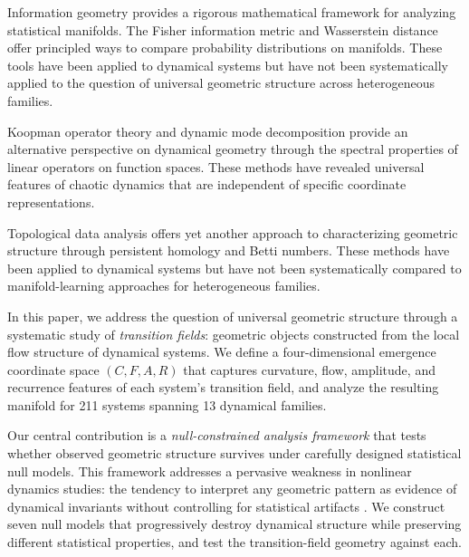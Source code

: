 \documentclass[aip,chaos,showpacs,superscriptaddress,groupedaddress]{revtex4-1}
\begin{document}
Information geometry \cite{amari2016information, amari1982differential, ay2017information} provides a rigorous mathematical framework for analyzing statistical manifolds. The Fisher information metric \cite{li2016fisher} and Wasserstein distance \cite{wasserstein1969sequential, villani2009optimal, peyre2019optimal} offer principled ways to compare probability distributions on manifolds. These tools have been applied to dynamical systems \cite{magnasco2009thermodynamic, bialek2001physics, bialek2014approach} but have not been systematically applied to the question of universal geometric structure across heterogeneous families.

Koopman operator theory \cite{koopman1931hamiltonian, mezic2013analysis} and dynamic mode decomposition \cite{brunton2021data, kutz2017dynamic} provide an alternative perspective on dynamical geometry through the spectral properties of linear operators on function spaces. These methods have revealed universal features of chaotic dynamics \cite{farmer1987predicting, kantz1997nonlinear, schreiber1999interdisciplinary} that are independent of specific coordinate representations.

Topological data analysis \cite{carlsson2009topology, edelsbrunner2010computational, zomorodian2005persistent} offers yet another approach to characterizing geometric structure through persistent homology and Betti numbers. These methods have been applied to dynamical systems \cite{sporns2011nonlinear} but have not been systematically compared to manifold-learning approaches for heterogeneous families.

In this paper, we address the question of universal geometric structure through a systematic study of \emph{transition fields}: geometric objects constructed from the local flow structure of dynamical systems. We define a four-dimensional emergence coordinate space $(C, F, A, R)$ that captures curvature, flow, amplitude, and recurrence features of each system's transition field, and analyze the resulting manifold for 211 systems spanning 13 dynamical families.

Our central contribution is a \emph{null-constrained analysis framework} that tests whether observed geometric structure survives under carefully designed statistical null models. This framework addresses a pervasive weakness in nonlinear dynamics studies: the tendency to interpret any geometric pattern as evidence of dynamical invariants without controlling for statistical artifacts \cite{theiler1990estimating}. We construct seven null models that progressively destroy dynamical structure while preserving different statistical properties, and test the transition-field geometry against each.
\end{document}
